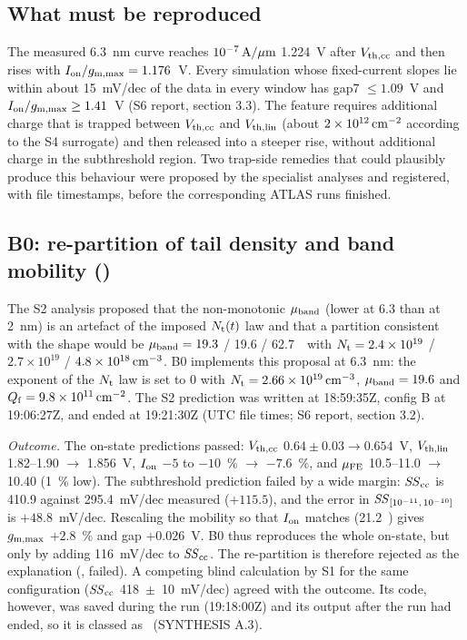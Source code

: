 \subsection{What must be reproduced}
The measured 6.3~nm curve reaches $10^{-7}\,\mathrm{A}/\mu\mathrm{m}$ 1.224~V after $V_{\mathrm{th,cc}}$ and then rises with $I_{\mathrm{on}}/g_{\mathrm{m,max}}=1.176$~V. Every simulation whose fixed-current slopes lie within about 15~mV/dec of the data in every window has gap7 $\le1.09$~V and $I_{\mathrm{on}}/g_{\mathrm{m,max}}\ge1.41$~V (S6 report, section 3.3). The feature requires additional charge that is trapped between $V_{\mathrm{th,cc}}$ and $V_{\mathrm{th,lin}}$ (about $2\times10^{12}\,\mathrm{cm}^{-2}$ according to the S4 surrogate) and then released into a steeper rise, without additional charge in the subthreshold region. Two trap-side remedies that could plausibly produce this behaviour were proposed by the specialist analyses and registered, with file timestamps, before the corresponding ATLAS runs finished.

\subsection{B0: re-partition of tail density and band mobility ()}
The S2 analysis proposed that the non-monotonic $\mu_{\mathrm{band}}$ (lower at 6.3 than at 2~nm) is an artefact of the imposed $N_{\mathrm{t}}(t)$ law and that a partition consistent with the shape would be $\mu_{\mathrm{band}}=19.3$ / 19.6 / 62.7~\cmVs\ with $N_{\mathrm{t}}=2.4\times10^{19}$ / $2.7\times10^{19}$ / $4.8\times10^{18}\,\mathrm{cm}^{-3}$. B0 implements this proposal at 6.3~nm: the exponent of the $N_{\mathrm{t}}$ law is set to 0 with $N_{\mathrm{t}}=\SI{2.66e19}{cm^{-3}}$, $\mu_{\mathrm{band}}=19.6$ and $Q_{\mathrm{f}}=\SI{9.8e11}{cm^{-2}}$. The S2 prediction was written at 18:59:35Z, config B at 19:06:27Z, and  ended at 19:21:30Z (UTC file times; S6 report, section 3.2).

\emph{Outcome.} The on-state predictions passed: $V_{\mathrm{th,cc}}$ $0.64\pm0.03\rightarrow0.654$~V, $V_{\mathrm{th,lin}}$ 1.82--1.90 $\rightarrow$ 1.856~V, $I_{\mathrm{on}}$ $-5$ to $-10$~\% $\rightarrow$ $-7.6$~\%, and $\mu_{\mathrm{FE}}$ 10.5--11.0 $\rightarrow$ 10.40 (1~\% low). The subthreshold prediction failed by a wide margin: $\mathit{SS}_{\mathrm{cc}}$ is 410.9 against 295.4~mV/dec measured ($+115.5$), and the error in $\mathit{SS}_{[10^{-11},\,10^{-10}]}$ is $+48.8$~mV/dec. Rescaling the mobility so that $I_{\mathrm{on}}$ matches (21.2~\cmVs) gives $g_{\mathrm{m,max}}$ $+2.8$~\% and gap $+0.026$~V. B0 thus reproduces the whole on-state, but only by adding 116~mV/dec to $\mathit{SS}_{\mathrm{cc}}$. The re-partition is therefore rejected as the explanation (\evOOS, failed). A competing blind calculation by S1 for the same configuration ($\mathit{SS}_{\mathrm{cc}}$ 418~$\pm$~10~mV/dec) agreed with the outcome. Its code, however, was saved during the run (19:18:00Z) and its output after the run had ended, so it is classed as \evPOST\ (SYNTHESIS A.3).

